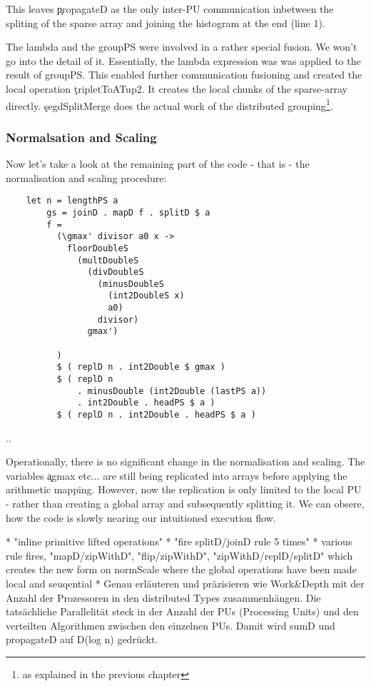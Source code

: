         This leaves \c{propagateD} as the only inter-PU communication inbetween the spliting of the
        sparse array and joining the histogram at the end (line 1).
        
        The lambda and the groupPS were involved in a rather special fusion. We won't
        go into the detail of it. Essentially, the lambda expression was
        was applied to the result of groupPS. This enabled further communication
        fusioning and created the local operation \c{tripletToATup2}. It creates the
        local chunks of the sparse-array directly. \c{segdSplitMerge} does the
        actual work of the distributed grouping\footnote[2]{as explained in the previous chapter}.
        
      \subsubsection{Normalsation and Scaling}
      
      Now let's take a look at the remaining part of the code - that is - the
      normalisation and scaling procedure:
      
      \begin{lstlisting}
    let n = lengthPS a
        gs = joinD . mapD f . splitD $ a
        f =
          (\gmax' divisor a0 x ->
            floorDoubleS
              (multDoubleS
                (divDoubleS
                  (minusDoubleS
                    (int2DoubleS x)
                    a0)
                  divisor)
                gmax')
            
          )
          $ ( replD n . int2Double $ gmax )
          $ ( replD n
              . minusDouble (int2Double (lastPS a))
              . int2Double . headPS $ a )
          $ ( replD n . int2Double . headPS $ a )
      \end{lstlisting}
      
      ..
      
      
      Operationally, there is no significant change in the normalisation and scaling.
      The variables \c{agmax} etc... are still being replicated into arrays
      before applying the arithmetic mapping. However, now the replication
      is only limited to the local PU - rather than creating a global array and
      subsequently splitting it. We can obsere, how the code is slowly nearing
      our intuitioned execution flow.
      
      * "inline primitive lifted operations"
      * "fire splitD/joinD rule 5 times"
      * various rule fires, "mapD/zipWithD", "flip/zipWithD", "zipWithD/replD/splitD"
        which creates the new form on normScale where the global operations have been made local and seuqential
      * Genau erläuteren und präzisieren wie Work&Depth mit der Anzahl der Prozessoren in den distributed Types zusammenhängen.
          Die tatsächliche Parallelität steck in der Anzahl der PUs (Processing Units) und den verteilten Algorithmen
          zwischen den einzelnen PUs. Damit wird sumD und propagateD auf D(log n) gedrückt.
          
